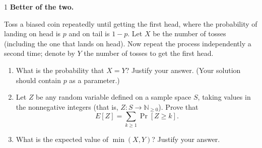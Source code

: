 \documentclass[12pt]{article}
\begin{document}



\begin{problem}{1}
    \textbf{Better of the two.} 
    
    Toss a biased coin repeatedly until getting the first head, where the probability of landing on head is $p$ and on tail is $1-p$. Let $X$ be the number of tosses (including the one that lands on head). Now repeat the process independently a second time; denote by $Y$ the number of tosses to get the first head.

    \begin{enumerate}
        \item[(a)] What is the probability that $X = Y$? Justify your answer. (Your solution should contain $p$ as a parameter.)

        \item[(b)] Let $Z$ be any random variable defined on a sample space $S$, taking values in the nonnegative integers (that is, $Z : S \to \mathbb{N}_{\ge 0}$). Prove that
        \[
        E[Z] = \sum_{k \ge 1} \Pr[Z \ge k].
        \]

        \item[(c)] What is the expected value of $\min(X,Y)$? Justify your answer.
    \end{enumerate}
\end{problem}
\end{document}
